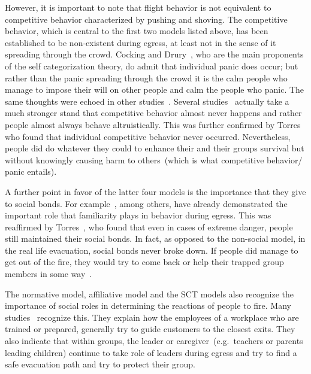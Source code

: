 However, it is important to note that flight behavior is not equivalent to competitive behavior characterized by pushing and shoving. The competitive behavior, which is central to the first two models listed above, has been established to be non-existent during egress, at least not in the sense of it spreading through the crowd. Cocking and Drury~\cite{Cocking:2005uc}, who are the main proponents of the self categorization theory, do admit that individual panic does occur; but rather than the panic spreading through the crowd it is the calm people who manage to impose their will on other people and calm the people who panic. The same thoughts were echoed in other studies~\cite{Paulsen:1984ti,Sime:1983uy,Schadschneider:2008cz}. Several studies~\cite{Sime:1983uy,Paulsen:1984ti,Drury:2009ga} actually take a much stronger stand that competitive behavior almost never happens and rather people almost always behave altruistically. This was further confirmed by Torres~\cite{Torres:2010tj} who found that individual competitive behavior never occurred. Nevertheless, people did do whatever they could to enhance their and their groups survival but without knowingly causing harm to others~(which is what competitive behavior/ panic entails).

A further point in favor of the latter four models is the importance that they give to social bonds. For example~\cite{Cornwell:2003uo,Chertkoff:1996vw,Andree:2008td}, among others, have already demonstrated the important role that familiarity plays in behavior during egress. This was reaffirmed by Torres~\cite{Torres:2010tj}, who found that even in cases of extreme danger, people still maintained their social bonds. In fact, as opposed to the non-social model, in the real life evacuation, social bonds never broke down. If people did manage to get out of the fire, they would try to come back or help their trapped group members in some way~\cite{Torres:2010tj,Kobes:2009jx}.

The normative model, affiliative model and the SCT models also recognize the importance of social roles in determining the reactions of people to fire. Many studies~\cite{Proulx:2003tc,Proulx:2001we,Paulsen:1984ti,Sandberg:1997tw,Cocking:2008vv,Tong:1985wn} recognize this. They explain how the employees of a workplace who are trained or prepared, generally try to guide customers to the closest exits. They also indicate that within groups, the leader or caregiver~(e.g.\ teachers or parents leading children) continue to take role of leaders during egress and try to find a safe evacuation path and try to protect their group.

